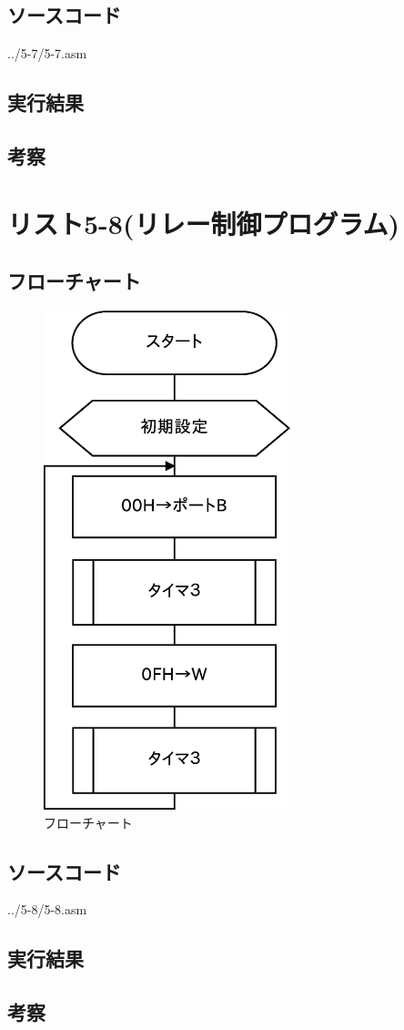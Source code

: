 \documentclass[a4paper,12pt]{ujarticle}
\begin{document}
  \subsection{ソースコード}
  \begin{lstinputlisting}[basicstyle=\ttfamily\footnotesize, frame=single]
   {../5-7/5-7.asm}
  \end{lstinputlisting}
  \subsection{実行結果}
  \subsection{考察}
 \section{リスト5-8(リレー制御プログラム)}
  \subsection{フローチャート}
  \begin{figure}[htbp]
   \begin{center}
    \includegraphics[height=145mm]{Diagram5-8.eps}
   \end{center}
   \caption{フローチャート}
   \label{fig}
  \end{figure}
  \clearpage
  \subsection{ソースコード}
  \begin{lstinputlisting}[basicstyle=\ttfamily\footnotesize, frame=single]
   {../5-8/5-8.asm}
  \end{lstinputlisting}
  \subsection{実行結果}
  \subsection{考察}
\end{document}
